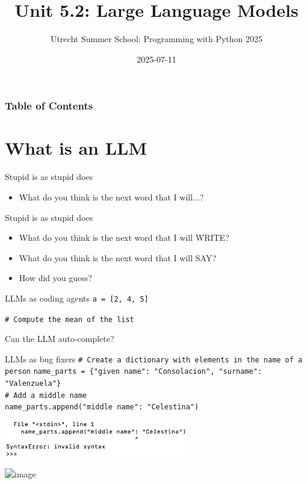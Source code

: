 \documentclass[t,xcolor={dvipsnames},final,aspectratio=169]{beamer}
\title{Unit 5.2:
Large Language Models}
\author{Utrecht Summer School: 
Programming with Python 2025}
\institute[UU]{
}
\date{2025-07-11}
\begin{document}
\begin{frame}
\maketitle
\end{frame}

{
\begin{frame}
\frametitle{Table of Contents}
\tableofcontents
\end{frame}
}

\section{What is an LLM}
\begin{frame}{Stupid is as stupid does}
\begin{itemize}
\item What do you think is the next word that I will...?
\end{itemize}
\end{frame}
\begin{frame}{Stupid is as stupid does}
\begin{itemize}
\item What do you think is the next word that I will WRITE?
\item What do you think is the next word that I will SAY?
\item How did you guess?
\end{itemize}
\end{frame}

\begin{frame}{LLMs as coding agents}
\texttt{a = [2, 4, 5]}
\pause

\texttt{\# Compute the mean of the list}
\pause

Can the LLM auto-complete?
\end{frame}

{
\begin{frame}{LLMs as bug fixers}
\texttt{\# Create a dictionary with elements in the name of a person}
\texttt{name\_parts = \{"given name": "Consolacion", "surname": "Valenzuela"\}} \\
\texttt{\# Add a middle name}\\
\texttt{name\_parts.append("middle name": "Celestina")}

\pause
\vfill
\includegraphics[width=8cm]{img/error.png}

\pause
\vfill
\includegraphics<+->[width=8cm]{img/llm.png}
\end{frame}
}
\end{document}
